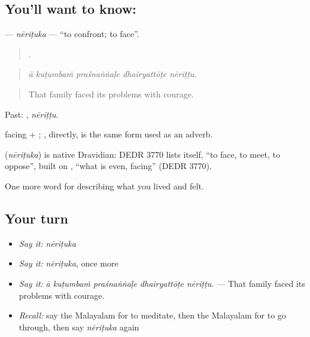 \subsection*{You'll want to know: }
\textbf{} — \emph{nēriṭuka} — \textquotedblleft{}to confront; to face\textquotedblright{}.

\begin{quote}
    .
\end{quote}

\begin{quote}
\emph{ā kuṭumbaṁ praśnaṅṅaḷe dhairyattōṭe nēriṭṭu.}
\end{quote}

\begin{quote}
That family faced its problems with courage.
\end{quote}

Past: , \emph{nēriṭṭu}.

 facing + ; , directly, is the same form used as an adverb.

\begin{cousinweb}
\textbf{} (\emph{nēriṭuka}) is native Dravidian: DEDR 3770 lists  itself, \textquotedblleft{}to face, to meet, to oppose\textquotedblright{}, built on , \textquotedblleft{}what is even, facing\textquotedblright{} (DEDR 3770).
\end{cousinweb}

\begin{grammarlens}[title={What you've built}]
One more word for describing what you lived and felt.
\end{grammarlens}

\subsection*{Your turn}
\begin{itemize}
\raggedright
  \item \emph{Say it:} \emph{nēriṭuka}
  \item \emph{Say it:} \emph{nēriṭuka}, once more
  \item \emph{Say it:} \emph{ā kuṭumbaṁ praśnaṅṅaḷe dhairyattōṭe nēriṭṭu.} — That family faced its problems with courage.
  \item \emph{Recall:} say the Malayalam for to meditate, then the Malayalam for to go through, then say \emph{nēriṭuka} again
\end{itemize}

